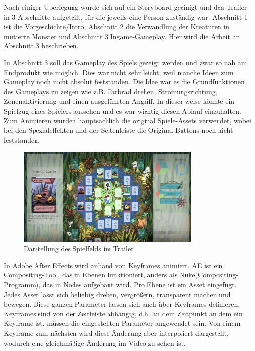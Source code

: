 Nach einiger Überlegung wurde sich auf ein Storyboard geeinigt und den Trailer in 3 Abschnitte aufgeteilt, für die jeweils eine Person zuständig war. Abschnitt 1 ist die Vorgeschichte/Intro, Abschnitt 2 die Verwandlung der Kreaturen in mutierte Monster und Abschnitt 3 Ingame-Gameplay. Hier wird die Arbeit an Abschnitt 3 beschrieben.

In Abschnitt 3 soll das Gameplay des Spiels gezeigt werden und zwar so nah am Endprodukt wie möglich. Dies war nicht sehr leicht, weil manche Ideen zum Gameplay noch nicht absolut feststanden. Die Idee war es die Grundfunktionen des Gameplays zu zeigen wie z.B. Farbrad drehen, Strömungsrichtung, Zonenaktivierung und einen ausgeführten Angriff. In dieser weise könnte ein Spielzug eines Spielers aussehen und es war wichtig diesen Ablauf einzuhalten. Zum Animieren wurden hauptsächlich die original Spiele-Assets verwendet, wobei bei den Spezialeffekten und der Seitenleiste die Original-Buttons noch nicht feststanden.

\begin{figure}
\includegraphics[width=0.8\textwidth]{../img/video_spielfeld.PNG}
\caption{Darstellung des Spielfelds im Trailer}
\label{fig:Videodarstellung Spielfeld}
\end{figure}

In Adobe After Effects wird anhand von Keyframes animiert. AE ist ein Compositing-Tool, das in Ebenen funktioniert, anders als Nuke(Compositing-Programm), das in Nodes aufgebaut wird.
Pro Ebene ist ein Asset eingefügt. Jedes Asset lässt sich beliebig drehen, vergrößern, transparent machen und bewegen. Diese ganzen Parameter lassen sich auch über Keyframes definieren. Keyframes sind von der Zeitleiste abhängig, d.h. an dem Zeitpunkt an dem ein Keyframe ist, müssen die eingestellten Parameter angewendet sein. Von einem Keyframe zum nächsten wird diese Änderung aber interpoliert dargestellt, wodurch eine gleichmäßige Änderung im Video zu sehen ist.

